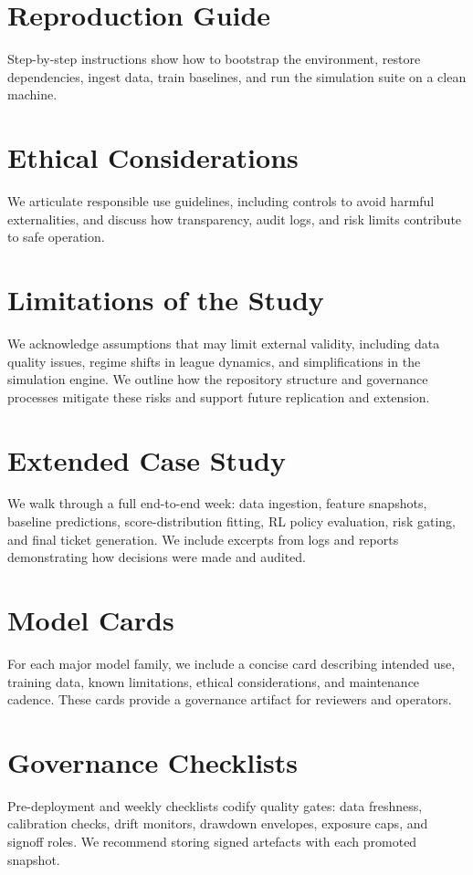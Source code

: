 \documentclass[12pt]{report}  %
\numberwithin{equation}{section}
\theoremstyle{plain}
\theoremstyle{definition}
\theoremstyle{remark}
\begin{document}
\section{Reproduction Guide}
Step-by-step instructions show how to bootstrap the environment, restore dependencies, ingest data, train baselines, and run the simulation suite on a clean machine.

\section{Ethical Considerations}
We articulate responsible use guidelines, including controls to avoid harmful externalities, and discuss how transparency, audit logs, and risk limits contribute to safe operation.

\section{Limitations of the Study}
We acknowledge assumptions that may limit external validity, including data quality issues, regime shifts in league dynamics, and simplifications in the simulation engine. We outline how the repository structure and governance processes mitigate these risks and support future replication and extension.

\section{Extended Case Study}
We walk through a full end-to-end week: data ingestion, feature snapshots, baseline predictions, score-distribution fitting, RL policy evaluation, risk gating, and final ticket generation. We include excerpts from logs and reports demonstrating how decisions were made and audited.

\section{Model Cards}
For each major model family, we include a concise card describing intended use, training data, known limitations, ethical considerations, and maintenance cadence. These cards provide a governance artifact for reviewers and operators.

\section{Governance Checklists}
Pre-deployment and weekly checklists codify quality gates: data freshness, calibration checks, drift monitors, drawdown envelopes, exposure caps, and signoff roles. We recommend storing signed artefacts with each promoted snapshot.
\end{document}
